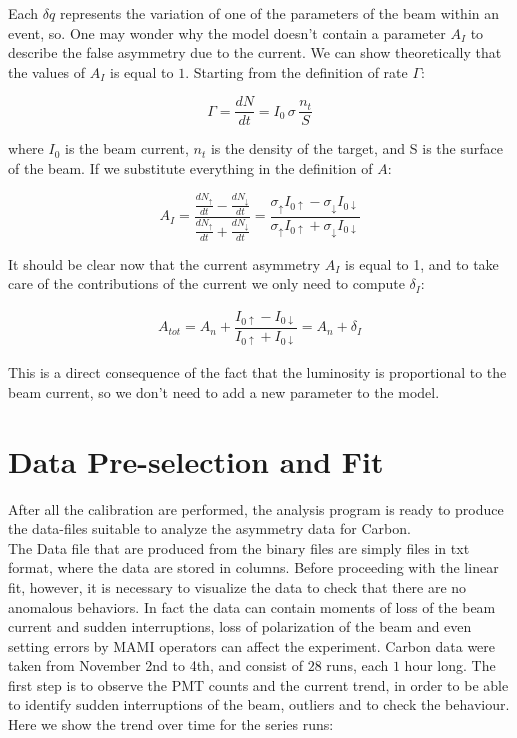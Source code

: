 Each $\delta q$ represents the variation of one of the parameters of the beam within an event, so.
One may wonder why the model doesn't contain a parameter $A_{I}$ to describe the false asymmetry due to the current. We can show theoretically that the values of $A_{I}$ is equal to $1$. Starting from the definition of rate $\Gamma$:

\begin{equation}
\Gamma = \frac{dN}{dt} = I_{0} \, \sigma \, \frac{n_{t}}{S}
\end{equation}

where $I_{0}$ is the beam current, $n_{t}$ is the density of the target, and S is the surface of the beam. If we substitute everything in the definition of $A$:

\begin{equation}
A_{I} = \dfrac{\frac{dN_{\uparrow}}{dt} - \frac{dN_{\downarrow}}{dt}}{\frac{dN_{\uparrow}}{dt} + \frac{dN_{\downarrow}}{dt}} = \dfrac{\sigma_{\uparrow} I_{0 \uparrow} - \sigma_{\downarrow} I_{0 \downarrow}}{\sigma_{\uparrow} I_{0 \uparrow} + \sigma_{\downarrow} I_{0 \downarrow}}
\end{equation}

It should be clear now that the current asymmetry $A_{I}$ is equal to 1, and to take care of the contributions of the current we only need to compute $\delta_{I}$: 

\begin{align*}
A_{tot} = A_{n} + \dfrac{I_{0 \uparrow} - I_{0 \downarrow}}{I_{0 \uparrow} + I_{0 \downarrow}} = A_{n} + \delta_{I}
\end{align*}

This is a direct consequence of the fact that the luminosity is proportional to the beam current, so we don't need to add a new parameter to the model.

\section{Data Pre-selection and Fit}

After all the calibration are performed, the analysis program is ready to produce the data-files suitable to analyze the asymmetry data for Carbon. \\
The Data file that are produced from the binary files are simply files in txt format, where the data are stored in columns. Before proceeding with the linear fit, however, it is necessary to visualize the data to check that there are no anomalous behaviors. In fact the data can contain moments of loss of the beam current and sudden interruptions, loss of polarization of the beam and even setting errors by MAMI operators can affect the experiment. Carbon data were taken from November 2nd to 4th, and consist of $28$ runs, each $1$ hour long.
The first step is to observe the PMT counts and the current trend, in order to be able to identify sudden interruptions of the beam, outliers and to check the behaviour. Here we show the trend over time for the series runs: 

